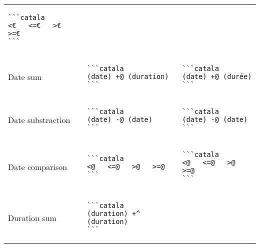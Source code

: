 \documentclass[a3paper,landscape]{article}
\begin{document}
\begin{multicols*}{2}
\begin{center}
\begin{tabular}{p{}p{}p{}}
\begin{verbatim}
```catala
<€   <=€   >€   >=€
```
\end{verbatim}
      \vspace*{-1.75em}
      \\
      Date sum                        &
      \vspace*{-1.75em}
      \begin{verbatim}
```catala
(date) +@ (duration)
```
\end{verbatim}
      \vspace*{-1.75em}
                                      &
      \vspace*{-1.75em}
      \begin{verbatim}
```catala
(date) +@ (durée)
```
\end{verbatim}
      \vspace*{-1.75em}
      \\
      Date substraction               &
      \vspace*{-1.75em}
      \begin{verbatim}
```catala
(date) -@ (date)
```
\end{verbatim}
      \vspace*{-1.75em}
                                      &
      \vspace*{-1.75em}
      \begin{verbatim}
```catala
(date) -@ (date)
```
\end{verbatim}
      \vspace*{-1.75em}
      \\
      Date comparison                 &
      \vspace*{-1.75em}
      \begin{verbatim}
```catala
<@   <=@   >@   >=@
```
\end{verbatim}
      \vspace*{-1.75em}
                                      &
      \vspace*{-1.75em}
      \begin{verbatim}
```catala
<@   <=@   >@   >=@
```
\end{verbatim}
      \vspace*{-1.75em}
      \\
      Duration sum                    &
      \vspace*{-1.75em}
      \begin{verbatim}
```catala
(duration) +^ (duration)
```
\end{verbatim}
      \vspace*{-1.75em}

\end{tabular}
\end{center}
\end{multicols*}
\end{document}
